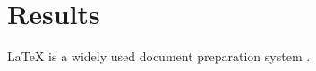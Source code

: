 \renewcommand*\chapterpagestyle{scrheadings}
\chapter{Results}
LaTeX is a widely used document preparation system \cite{wiki:latex}.

